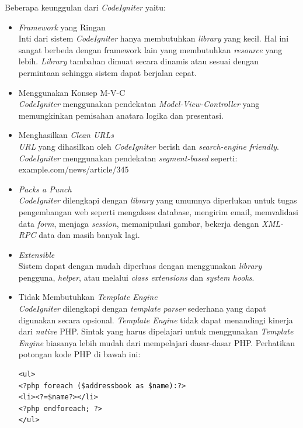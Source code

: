 \documentclass[a4paper,twoside]{article}
\begin{document}
\begin{enumerate}
\begin{enumerate}
			Beberapa keunggulan dari \textit{CodeIgniter} yaitu:
			\begin{itemize}
				\item \textit{Framework} yang Ringan \\
				Inti dari sistem \textit{CodeIgniter} hanya membutuhkan \textit{library} yang kecil. Hal ini sangat berbeda dengan framework lain yang membutuhkan \textit{resource} yang lebih. \textit{Library} tambahan dimuat secara dinamis atau sesuai dengan permintaan sehingga sistem dapat berjalan cepat.
				\item Menggunakan Konsep M-V-C \\
				\textit{CodeIgniter} menggunakan pendekatan \textit{Model-View-Controller} yang memungkinkan pemisahan anatara logika dan presentasi.
				\item Menghasilkan \textit{Clean URLs} \\
				\textit{URL} yang dihasilkan oleh  \textit{CodeIgniter} berish dan \textit{search-engine friendly}. \textit{CodeIgniter} menggunakan pendekatan \textit{segment-based} seperti: \\example.com/news/article/345
				\item \textit{Packs a Punch} \\
				\textit{CodeIgniter} dilengkapi dengan \textit{library} yang umumnya diperlukan untuk tugas pengembangan web seperti mengakses database, mengirim email, memvalidasi data \textit{form}, menjaga \textit{session}, memanipulasi gambar, bekerja dengan \textit{XML-RPC} data dan masih banyak lagi.
				\item \textit{Extensible} \\
				Sistem dapat dengan mudah diperluas dengan menggunakan \textit{library} pengguna, \textit{helper}, atau melalui \textit{class extensions} dan \textit{system hooks}.
				\item Tidak Membutuhkan \textit{Template Engine} \\
				\textit{CodeIgniter} dilengkapi dengan \textit{template parser} sederhana yang dapat digunakan secara opsional. \textit{Template Engine} tidak dapat menandingi kinerja dari \textit{native} PHP. Sintak yang harus dipelajari untuk menggunakan \textit{Template Engine} biasanya lebih mudah dari mempelajari dasar-dasar PHP. Perhatikan potongan kode PHP di bawah ini: \\
				\begin{lstlisting}[backgroundcolor = \color{lightgray}]
<ul>
<?php foreach ($addressbook as $name):?>
<li><?=$name?></li>
<?php endforeach; ?>
</ul>
				\end{lstlisting}
				

\end{itemize}
\end{enumerate}
\end{enumerate}
\end{document}
